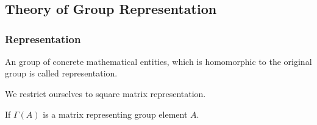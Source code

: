 \chapter[Lecture 6]{}\label{chap6}

\section*{Theory of Group Representation}

\subsection*{Representation}

An group of concrete mathematical entities, which is homomorphic to the original group is called representation.

We restrict ourselves to square matrix representation.

If $\Gamma(A)$ is a matrix representing group element $A$.

